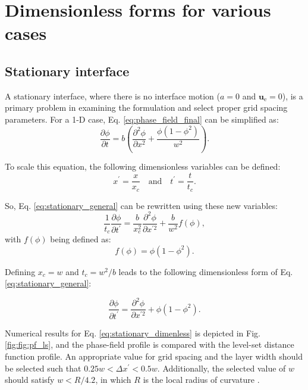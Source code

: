 \section{Dimensionless forms for various cases}

\subsection{Stationary interface}

A stationary interface, where there is no interface motion ($a=0$ and $\boldsymbol{u}_{\mathrm{e}}=0$), is a primary problem in examining the formulation and select proper grid spacing parameters. For a 1-D case, Eq. \ref{eq:phase_field_final} can be simplified as:
\begin{equation} \label{eq:stationary_general}
\frac{\partial \phi}{\partial t}=b\left(\frac{\partial^{2} \phi}{\partial x^{2}}+\frac{\phi\left(1-\phi^{2}\right)}{w^{2}}\right).
\end{equation}

To scale this equation, the following dimensionless variables can be defined:
\begin{equation} \label{eq:dimenless_variables}
x^\prime = \frac{x}{x_c} \quad \text{and} \quad t^\prime = \frac{t}{t_c}.
\end{equation}

So, Eq. \ref{eq:stationary_general} can be rewritten using these new variables:
\begin{equation}
\frac{1}{t_{c}} \frac{\partial \phi}{\partial t^{\prime}}=\frac{b}{x_{c}^{2}} \frac{\partial^{2} \phi}{\partial x^{\prime 2}}+\frac{b}{w^{2}} f(\phi),
\end{equation}
with $f(\phi)$ being defined as:
\begin{equation}
f(\phi)=\phi\left(1-\phi^{2}\right).
\end{equation}

Defining $x_c = w$ and $t_c=w^2/b$ leads to the following dimensionless form of Eq. \ref{eq:stationary_general}:

\begin{equation} \label{eq:stationary_dimenless}
\frac{\partial \phi}{\partial t^{\prime}}=\frac{\partial^{2} \phi}{\partial x^{\prime 2}}+\phi\left(1-\phi^{2}\right).
\end{equation}

Numerical results for Eq. \ref{eq:stationary_dimenless} is depicted in Fig.  \ref{fig:fig:pf_ls}, and the phase-field profile is compared with the level-set distance function profile. An appropriate value for grid spacing and the layer width should be selected such that $0.25 w < \Delta x^\prime < 0.5 w $. Additionally, the selected value of $w$ should satisfy $w < R/4.2$, in which $R$ is the local radius of curvature \cite{Sun2007}.

